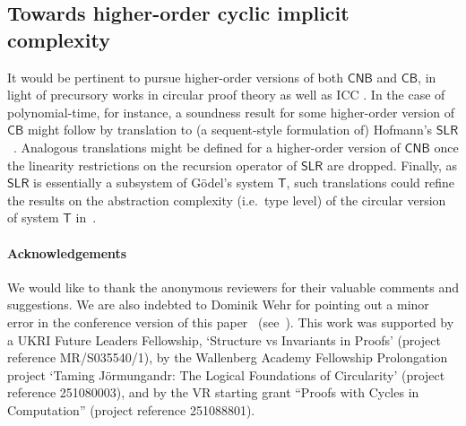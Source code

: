 \documentclass[manuscript,screen]{acmart}
\newcommand{\anupam}[1]{\todo{A: #1}}
\theoremstyle{definition}
\theoremstyle{remark}
\renewcommand{\succ}[1]{\mathsf{s}_{#1}}
\newcommand{\safenesrec}{\mathsf{snrec}}
\newcommand{\snrec}{\safenesrec}
\newcommand{\bc}{\mathsf{B}}
\newcommand{\bcnorec}{\bc^{-}}
\newcommand{\nested}{\mathsf{N}}
\newcommand{\nbc}{\nested\bc}
\newcommand{\shallow}{\mathsf{S}}
\newcommand{\sbc}{\shallow\bc}
\newcommand{\cyclic}{\mathsf{C}}
\newcommand{\cbc}{\cyclic\bc}
\newcommand{\ncbc}{\cyclic\nested\bc}
\newcommand{\slr}{\mathsf{SLR}}
\newcommand{\tgodel}{\mathsf{T}}
\begin{document}

\subsection{Towards higher-order cyclic implicit complexity}
It would be pertinent to pursue higher-order versions of both $\ncbc$ and $\cbc$, in light of precursory works \cite{Das2021,Kuperberg-Pous21} in circular proof theory as well as ICC {\cite{Hofmann97,Leivant99,BellantoniNS00}}.
 In the case of polynomial-time, for instance,
 a soundness result for some higher-order version of $\cbc$ might follow by translation to (a sequent-style formulation of) Hofmann's $\slr$~\cite{Hofmann97}. 
 Analogous translations might be defined for a higher-order version of $\ncbc$ once the linearity restrictions on the recursion operator of $\slr$ are dropped. 
 Finally, as $\slr$ is essentially a subsystem of G\"{o}del's system $\tgodel$, such translations could refine the results on the  abstraction complexity (i.e.~type level) of the circular version of system $\tgodel$  in~\cite{Das2021,Das2021-preprint}. 
 
\paragraph{Acknowledgements}

We would like to thank {the anonymous reviewers for their valuable comments and suggestions. We are also indebted to} Dominik Wehr for pointing out a minor error in the conference version of this paper~\cite{CurziDas:lics22} (see~).
This work was supported by a UKRI Future Leaders Fellowship, ‘Structure vs Invariants in Proofs’ (project reference MR/S035540/1),   by the Wallenberg Academy Fellowship Prolongation 
project `Taming Jörmungandr: The Logical Foundations of Circularity' (project reference 251080003), and by the
VR starting grant “Proofs with Cycles in Computation” (project reference 251088801).
\end{document}
